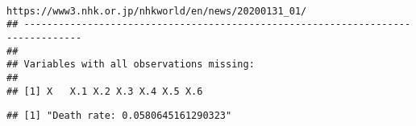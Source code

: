 \documentclass[
]{article}
\newenvironment{Shaded}{\begin{snugshade}}{\end{snugshade}}
\newcommand{\CommentTok}[1]{\textcolor[rgb]{0.56,0.35,0.01}{\textit{#1}}}
\newcommand{\DecValTok}[1]{\textcolor[rgb]{0.00,0.00,0.81}{#1}}
\newcommand{\FunctionTok}[1]{\textcolor[rgb]{0.13,0.29,0.53}{\textbf{#1}}}
\newcommand{\NormalTok}[1]{#1}
\newcommand{\OtherTok}[1]{\textcolor[rgb]{0.56,0.35,0.01}{#1}}
\newcommand{\SpecialCharTok}[1]{\textcolor[rgb]{0.81,0.36,0.00}{\textbf{#1}}}
\newcommand{\StringTok}[1]{\textcolor[rgb]{0.31,0.60,0.02}{#1}}
\begin{document}
\begin{verbatim}
                                                                                                                                                                                                                                                                                                                                                                                                                                                                                                                                                                                                          https://www3.nhk.or.jp/nhkworld/en/news/20200131_01/                                                                                                                                                                                                                                                                                                                                                                                                                                                                                                                                                                                                                                                                                                                                                                           
## --------------------------------------------------------------------------------
## 
## Variables with all observations missing:
## 
## [1] X   X.1 X.2 X.3 X.4 X.5 X.6
\end{verbatim}

\begin{Shaded}
\end{Shaded}

\begin{verbatim}
## [1] "Death rate: 0.0580645161290323"
\end{verbatim}
\end{document}
